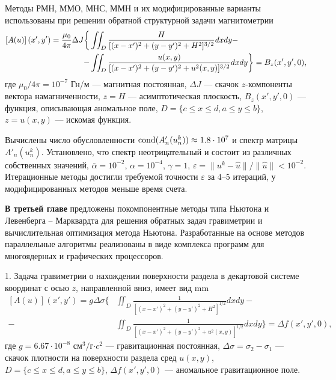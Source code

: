 \documentclass[%
autoref,     %
href,        %
colorlinks,  %
]{disser}
\begin{document}
Методы РМН, ММО, МНС, ММН и их модифицированные варианты использованы при решении обратной структурной задачи магнитометрии
\begin{equation*}\begin{aligned}
\left[A(u)\right](x',y')=\frac{\mu_0}{4\pi}\Delta J  \bigg\{&\iint_{D} \frac{H}{[(x-x')^2+(y-y')^2+H^2]^{3/2}}dxdy - \notag\\
- &\iint_{D} \frac{u(x,y)}{[(x-x')^2+(y-y')^2+u^2(x,y)]^{3/2}}dxdy \bigg\}= B_z(x',y',0),
\end{aligned} \end{equation*}
где $\mu_0/{4\pi}=10^{-7}$ Гн/м --- магнитная постоянная, $\Delta J$ --- скачок $z$-компоненты вектора намагниченности, $z=H$ --- асимптотическая плоскость, $ B_z(x',y',0)$ --- функция, описывающая  аномальное поле, $D=\{c\leqslant x \leqslant d, a\leqslant y \leqslant b\}$, $z=u(x,y)$ --- искомая функция.

Вычислены число обусловленности $\textnormal{cond}(A'_n(u_n^k))\approx 1.8\cdot 10^7$ и спектр матрицы $A'_n(u_n^k)$. Установлено, что спектр неотрицательный и состоит из различных собственных значений, $\bar\alpha=10^{-2}$, $\alpha = 10^{-4}$, $\gamma=1$, $\varepsilon =\|u^k-\hat{u}\|/\|\hat{u}\| < 10^{-2}$. Итерационные методы достигли требуемой точности $\varepsilon$ за 4--5 итераций, у модифицированных методов меньше время счета.

\textbf{В третьей главе} предложены покомпонентные методы типа Ньютона и Левенберга -- Марквардта для решения обратных задач гравиметрии и вычислительная оптимизация метода Ньютона. Разработанные на основе методов параллельные алгоритмы реализованы в виде комплекса программ для многоядерных и графических процессоров.

1. Задача гравиметрии о нахождении поверхности раздела в декартовой системе координат с осью $z$, направленной вниз, имеет вид
 mm
\begin{equation}\label{equ_grav_2l}
\begin{aligned}
\left[A(u)\right](x',y')=g\Delta\sigma \bigg\{ &\iint_{D} \frac{1}{[(x-x')^2+(y-y')^2+H^2]^{1/2}}dxdy - \\
- &\iint_{D} \frac{1}{[(x-x')^2+(y-y')^2+u^2(x,y)]^{1/2}}dxdy\bigg\}=\Delta f(x',y',0),
\end{aligned} 
\end{equation}
	где $g=6.67\cdot10^{-8}$ см$^3/$г$\cdot c^2$ --- гравитационная постоянная, $\Delta\sigma=\sigma_2-\sigma_1$ --- скачок плотности на поверхности раздела сред $u(x,y)$, $D=\{c\leqslant x \leqslant d, a\leqslant y \leqslant b\}$, $\Delta f(x',y',0)$ --- аномальное гравитационное поле.%
	
\end{document}
